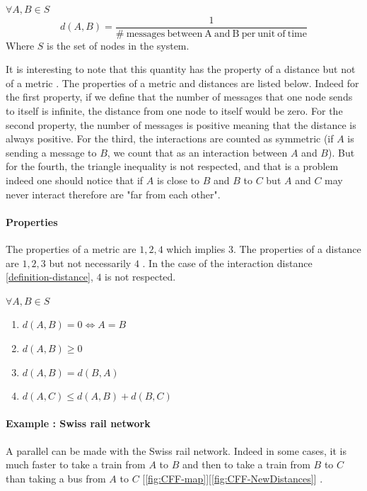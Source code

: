 \documentclass[a4paper,11pt,twoside=semi,openright]{report}
\begin{document}
$\forall A, B \in S$
\begin{equation} \label{definition-distance}
 d(A,B) = \frac{1}{ \mathrm{\#\ messages\ between\ A\ and\ B\ per\ unit\ of\ time} } 
\end{equation}
Where $S$ is the set of nodes in the system.

It is interesting to note that this quantity has the property of a distance but
not of a metric \cite{Greenhoe2016}. The properties of a metric and distances
are listed below.  Indeed for the first property, if we define that the number
of messages that one node sends to itself is infinite, the distance from one
node to itself would be zero. For the second property, the number of messages
is positive meaning that the distance is always positive. For the third, the
interactions are counted as symmetric (if $A$ is sending a message to $B$, we
count that as an interaction between $A$ and $B$).  But for the fourth, the
triangle inequality is not respected, and that is a problem indeed one should
notice that if $A$ is close to $B$ and $B$ to $C$ but $A$ and $C$ may never
interact therefore are "far from each other".  

\paragraph{Properties} The properties of a metric are $1, 2, 4$ which implies
$3$. The properties of a distance are $1,2,3$ but not necessarily $4$
\cite{Greenhoe2016}. In the case of the interaction distance
\autoref{definition-distance}, $4$ is not respected.

$\forall A,B \in S$
\begin{enumerate}
\item $d(A,B) = 0 \Leftrightarrow A = B$
\item $d(A,B) \geq 0$
\item $d(A,B) = d(B,A)$
 \color{red} \item$d(A, C) \leq d(A,B) + d(B,C)$ \color{black}
\end{enumerate}

\paragraph{Example : Swiss rail network}
A parallel can be made with the Swiss rail network. Indeed in some cases, it is much
faster to take a train from $A$ to $B$ and then to take a train from $B$ to $C$
than taking a bus from $A$ to $C$ [\autoref{fig:CFF-map}][\autoref{fig:CFF-NewDistances}] . 
\end{document}
